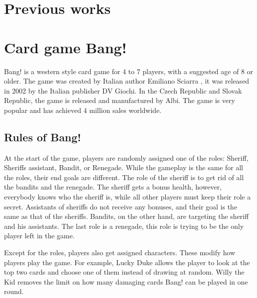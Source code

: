 

\section{Previous works}



\section{Card game Bang!}
Bang! is a western style card game for 4 to 7 players, with a suggested age of 8 or older. The game was created by Italian author Emiliano Sciarra \cite{bangWiki}, it was released in 2002 by the Italian publisher DV Giochi. In the Czech Republic and Slovak Republic, the game is released and manufactured by Albi. The game is very popular and has achieved 4 million sales worldwide.
\subsection{Rules of Bang!}

At the start of the game, players are randomly assigned one of the roles: Sheriff, Sheriffs assistant, Bandit, or Renegade. While the gameplay is the same for all the roles, their end goals are different. The role of the sheriff is to get rid of all the bandits and the renegade. The sheriff gets a bonus health, however, everybody knows who the sheriff is, while all other players must keep their role a secret. Assistants of sheriffs do not receive any bonuses, and their goal is the same as that of the sheriffs. Bandits, on the other hand, are targeting the sheriff and his assistants. The last role is a renegade, this role is trying to be the only player left in the game.

Except for the roles, players also get assigned characters. These modify how players play the game. For example, 
Lucky Duke allows the player to look at the top two cards and choose one of them instead of drawing at random.
Willy the Kid removes the limit on how many damaging cards Bang! can be played in one round.


